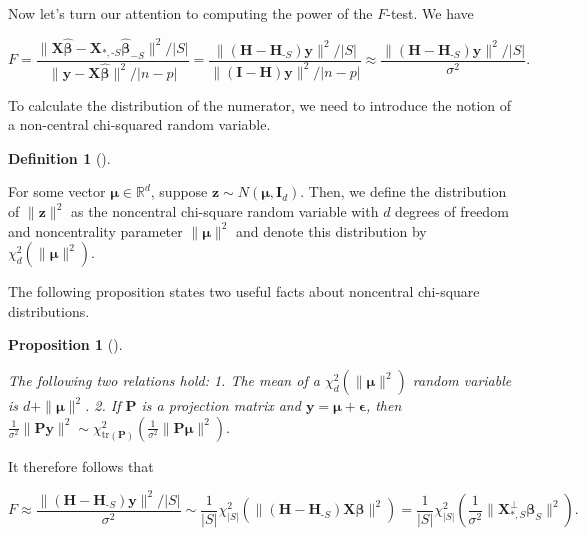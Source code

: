 \documentclass[
  11pt,
  letterpaper,
  oneside]{book}
\theoremstyle{definition}
\newtheorem{definition}{Definition}[chapter]
\theoremstyle{plain}
\theoremstyle{plain}
\newtheorem{proposition}{Proposition}[chapter]
\theoremstyle{plain}
\theoremstyle{remark}
\begin{document}
Now let's turn our attention to computing the power of the \(F\)-test.
We have

\[
F = \frac{\|\boldsymbol{X}\boldsymbol{\widehat \beta} - \boldsymbol{X}_{*, \text{-}S}\boldsymbol{\widehat \beta}_{-S}\|^2/|S|}{\|\boldsymbol{y} - \boldsymbol{X}\boldsymbol{\widehat \beta}\|^2/|n-p|} = \frac{\|(\boldsymbol{H}-\boldsymbol{H}_{\text{-}S}) \boldsymbol{y}\|^2/|S|}{\|(\boldsymbol{I} - \boldsymbol{H})\boldsymbol{y}\|^2/|n-p|} \approx \frac{\|(\boldsymbol{H}-\boldsymbol{H}_{\text{-}S}) \boldsymbol{y}\|^2/|S|}{\sigma^2}.
\]

To calculate the distribution of the numerator, we need to introduce the
notion of a non-central chi-squared random variable.

\begin{definition}[]\protect\hypertarget{def-noncentral-chi-square}{}\label{def-noncentral-chi-square}

For some vector \(\boldsymbol{\mu} \in \mathbb{R}^d\), suppose
\(\boldsymbol{z} \sim N(\boldsymbol{\mu}, \boldsymbol{I}_d)\). Then, we
define the distribution of \(\|\boldsymbol{z}\|^2\) as the noncentral
chi-square random variable with \(d\) degrees of freedom and
noncentrality parameter \(\|\boldsymbol{\mu}\|^2\) and denote this
distribution by \(\chi^2_d(\|\boldsymbol{\mu}\|^2)\).

\end{definition}

The following proposition states two useful facts about noncentral
chi-square distributions.

\begin{proposition}[]\protect\hypertarget{prp-noncentral-chi-square}{}\label{prp-noncentral-chi-square}

The following two relations hold: 1. The mean of a
\(\chi^2_d(\|\boldsymbol{\mu}\|^2)\) random variable is
\(d + \|\boldsymbol{\mu}\|^2\). 2. If \(\boldsymbol{P}\) is a projection
matrix and
\(\boldsymbol{y} = \boldsymbol{\mu} + \boldsymbol{\epsilon}\), then
\(\frac{1}{\sigma^2}\|\boldsymbol{P} \boldsymbol{y}\|^2 \sim \chi^2_{\text{tr}(\boldsymbol{P})}\left(\frac{1}{\sigma^2}\|\boldsymbol{P} \boldsymbol{\mu}\|^2\right).\)

\end{proposition}

It therefore follows that

\[
F \approx \frac{\|(\boldsymbol{H}-\boldsymbol{H}_{\text{-}S}) \boldsymbol{y}\|^2/|S|}{\sigma^2} \sim \frac{1}{|S|}\chi^2_{|S|}\left(\|(\boldsymbol{H}-\boldsymbol{H}_{\text{-}S})\boldsymbol{X} \boldsymbol{\beta}\|^2\right) = \frac{1}{|S|}\chi^2_{|S|}\left(\frac{1}{\sigma^2}\|\boldsymbol{X}^\perp_{*, S}\boldsymbol{\beta}_S\|^2\right).
\]
\end{document}
